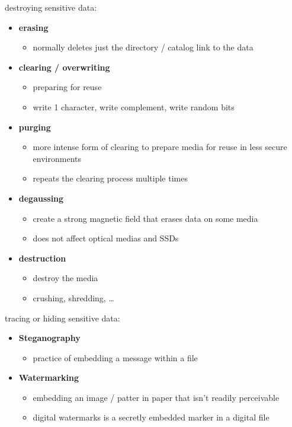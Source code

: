 \documentclass[11pt,twoside,landscape]{article}
\begin{document}
\begin{multicols}{4}
destroying sensitive data:
\begin{itemize}
\item \textbf{erasing}
\begin{itemize}
\item normally deletes just the directory / catalog link to the data
\end{itemize}
\item \textbf{clearing / overwriting}
\begin{itemize}
\item preparing for reuse
\item write 1 character, write complement, write random bits
\end{itemize}
\item \textbf{purging}
\begin{itemize}
\item more intense form of clearing to prepare media for reuse in less secure environments
\item repeats the clearing process multiple times
\end{itemize}
\item \textbf{degaussing}
\begin{itemize}
\item create a strong magnetic field that erases data on some media
\item does not affect optical medias and SSDs
\end{itemize}
\item \textbf{destruction}
\begin{itemize}
\item destroy the media
\item crushing, shredding, \ldots{}
\end{itemize}
\end{itemize}

tracing or hiding sensitive data:
\begin{itemize}
\item \textbf{Steganography}
\begin{itemize}
\item practice of embedding a message within a file
\end{itemize}
\item \textbf{Watermarking}
\begin{itemize}
\item embedding an image / patter in paper that isn't readily perceivable
\item digital watermarks is a secretly embedded marker in a digital file
\end{itemize}
\end{itemize}


\end{multicols}
\end{document}
